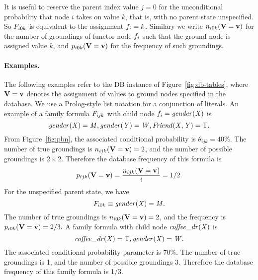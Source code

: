 \documentclass[twoside,leqno,twocolumn]{article}
\begin{document}
It is useful to reserve the parent index value $j=0$ for the unconditional probability that node $i$ takes on value $k$, that is, with no parent state unspecified. So $F_{i0k}$ is equivalent to the assignment $f_{i} = k$. Similary we write  $n_{i0k}(\mathbf{V} = \mathbf{v})$ for the number of groundings of functor node $f_{i}$ such that the ground node is assigned value $k$, and $p_{i0k}(\mathbf{V} = \mathbf{v})$ for the frequency of such groundings. 



\paragraph{Examples.} The following examples refer to the DB instance of Figure~\ref{fig:db-tables}, where $\mathbf{V} = \mathbf{v}$ denotes the assignment of values to ground nodes specified in the database.
We use a Prolog-style list notation for a conjunction of literals. 
An example of a family formula $F_{ijk}$  with child node $f_{i}=\it{gender}(X)$ is 
\[ \it{gender}(X)= M,\it{gender}(Y) = W,\it{Friend}(X,Y) = \mathrm{T}.\] 
From Figure~\ref{fig:pbn}, the associated conditional probability is $\theta_{ijk}= 40\%$.
The number of true groundings is $n_{ijk}(\mathbf{V} = \mathbf{v}) = 2$, and the number of possible groundings is  $2 \times 2$. Therefore the database frequency of this formula is \[p_{ijk}(\mathbf{V} = \mathbf{v}) = \frac{n_{ijk}(\mathbf{V} = \mathbf{v})}{4}= 1/2.\] For the unspecified parent state, we have \[F_{i0k} \equiv \it{gender}(X) = M.\] The number of true groundings is $n_{i0k}(\mathbf{V} = \mathbf{v}) = 2$, and the frequency is $p_{i0k}(\mathbf{V} = \mathbf{v}) = 2/3.$
%
A family formula with child node $\it{coffee\_{dr}}(X)$ is \[\it{coffee\_{dr}}(X) = \mathrm{T}, \it{gender}(X) = W.\] The associated conditional probability parameter is 70\%.
The number of true groundings is 1, and the number of possible groundings 3. 
Therefore the database frequency of this family formula is 1/3.
\end{document}
